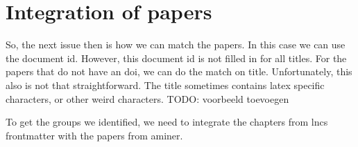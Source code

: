 \documentclass{ou-report}
\newcommand{\todo}[1]{{\color{red} TODO: #1}}
\begin{document}
\section{Integration of papers}

So, the next issue then is how we can match the papers. In this case we can use
the document id. However, this document id is not filled in for all titles. For
the papers that do not have an doi, we can do the match on title. Unfortunately,
this also is not that straightforward. The title sometimes contains latex 
specific characters, or other weird characters.
\todo{voorbeeld toevoegen}

To get the groups we identified, we need to integrate the chapters from lncs 
frontmatter with the papers from aminer.

\end{document}
